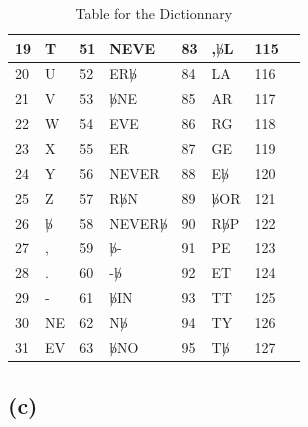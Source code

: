 \documentclass{article}[12pt]
\begin{document}
\begin{table}[htbp]
\begin{tabular}{||p{0.3 in}|p{0.6 in}||p{0.3 in}|p{0.6 in}||p{0.3 in}|p{0.6 in}||p{0.3 in}|p{0.6 in}||}
19 & T          & 51 & NEVE           & 83 & ,$\not b$L & 115 &   \\ \hline
20 & U          & 52 & ER$\not b$     & 84 & LA         & 116 &   \\ \hline
21 & V          & 53 & $\not b$NE     & 85 & AR         & 117 &   \\ \hline
22 & W          & 54 & EVE            & 86 & RG         & 118 &   \\ \hline
23 & X          & 55 & ER             & 87 & GE         & 119 &   \\ \hline
24 & Y          & 56 & NEVER          & 88 & E$\not b$  & 120 &   \\ \hline
25 & Z          & 57 & R$\not b$N     & 89 & $\not b$OR & 121 &   \\ \hline
26 & $\not b$   & 58 & NEVER$\not b$  & 90 & R$\not b$P & 122 &   \\ \hline
27 & ,          & 59 & $\not b$-      & 91 & PE         & 123 &   \\ \hline
28 & .          & 60 & -$\not b$      & 92 & ET         & 124 &   \\ \hline
29 & -          & 61 & $\not b$IN     & 93 & TT         & 125 &   \\ \hline
30 & NE         & 62 & N$\not b$      & 94 & TY         & 126 &   \\ \hline
31 & EV         & 63 & $\not b$NO     & 95 & T$\not b$  & 127 &   \\ \hline
\end{tabular}
  \caption{Table for the Dictionnary}
  \label{tab:dico}
\end{table}

\subsection*{(c)}
\end{document}
